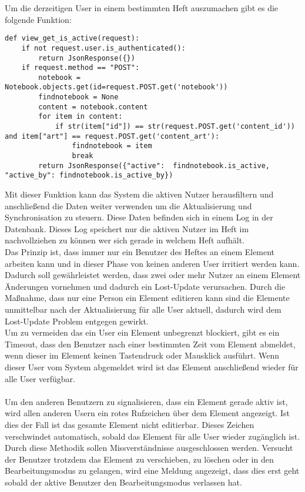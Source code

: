 Um die derzeitigen User in einem bestimmten Heft auszumachen gibt es die folgende Funktion:
\begin{lstlisting}[caption={Abfrage der aktiven Nutzer - PWS}]
def view_get_is_active(request):
    if not request.user.is_authenticated():
        return JsonResponse({})
    if request.method == "POST":
        notebook = Notebook.objects.get(id=request.POST.get('notebook'))
        findnotebook = None
        content = notebook.content
        for item in content:
            if str(item["id"]) == str(request.POST.get('content_id')) and item["art"] == request.POST.get('content_art'):
                findnotebook = item
                break
        return JsonResponse({"active":  findnotebook.is_active, "active_by": findnotebook.is_active_by})
\end{lstlisting}
Mit dieser Funktion kann das System die aktiven Nutzer herausfiltern und anschließend die Daten weiter verwenden um die Aktualisierung und Synchronisation zu steuern. Diese Daten befinden sich in einem Log in der Datenbank. Dieses Log speichert nur die aktiven Nutzer im Heft im nachvollziehen zu können wer sich gerade in welchem Heft aufhält.
\\
Das Prinzip ist, dass immer nur ein Benutzer des Heftes an einem Element arbeiten kann und in dieser Phase von keinen anderen User irritiert werden kann. Dadurch soll gewährleistet werden, dass zwei oder mehr Nutzer an einem Element Änderungen vornehmen und dadurch ein Lost-Update verursachen. Durch die Maßnahme, dass nur eine Person ein Element editieren kann sind die Elemente unmittelbar nach der Aktualisierung für alle User aktuell, dadurch wird dem Lost-Update Problem entgegen gewirkt.\\
Um zu vermeiden das ein User ein Element unbegrenzt blockiert, gibt es ein Timeout, dass den Benutzer nach einer bestimmten Zeit vom Element abmeldet, wenn dieser im Element keinen Tastendruck oder Mausklick ausführt. Wenn dieser User vom System abgemeldet wird ist das Element anschließend wieder für alle User verfügbar.\\
\\
Um den anderen Benutzern zu signalisieren, dass ein Element gerade aktiv ist, wird allen anderen Usern ein rotes Rufzeichen über dem Element angezeigt. Ist dies der Fall ist das gesamte Element nicht editierbar. 
Dieses Zeichen verschwindet automatisch, sobald das Element für alle User wieder zugänglich ist. Durch diese Methodik sollen Missverständnisse ausgeschlossen werden. Versucht der Benutzer trotzdem das Element zu verschieben, zu löschen oder in den Bearbeitungsmodus zu gelangen, wird eine Meldung angezeigt, dass dies erst geht sobald der aktive Benutzer den Bearbeitungsmodus verlassen hat. \\
